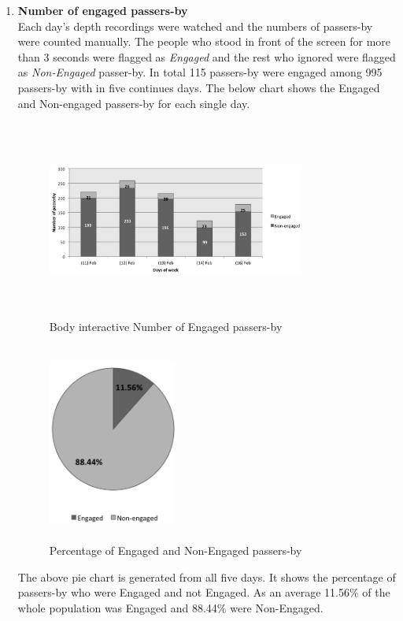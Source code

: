 \begin{enumerate}
\item \textbf{Number of engaged passers-by} \\
Each day’s depth recordings were watched and the numbers of passers-by were counted manually. The people who stood in front of the screen for more than 3 seconds were flagged as \emph{Engaged} and the rest who ignored were flagged as \emph{Non-Engaged} passer-by. In total 115 passers-by were engaged among 995 passers-by with in five continues days. The below chart shows the Engaged and Non-engaged passers-by for each single day.

\begin{figure}[H]
    \centering
    \includegraphics[width=0.8\textwidth,height=6.5cm]{Figures/8/body_inter_findings/body_inter_engage_day}
    \caption{Body interactive Number of Engaged passers-by}%
    \label{fig:bodyengagedandengagedby}%
\end{figure}


\begin{figure}[H]
    \centering
    \includegraphics[width=0.4\textwidth,height=6.5cm]{Figures/8/body_inter_findings/body_eng_percentage}
    \caption{Percentage of Engaged and Non-Engaged passers-by}%
    \label{fig:bodyengagedpasserbypercentage}%
\end{figure}

The above pie chart is generated from all five days. It shows the percentage of passers-by who were Engaged and not Engaged. As an average 11.56\% of the whole population was Engaged and 88.44\% were Non-Engaged.

\end{enumerate}


